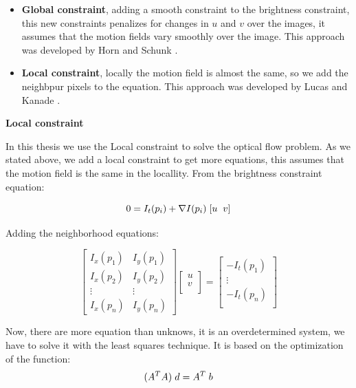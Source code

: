 \documentclass[12pt, a4paper, titlepage,twoside,openright]{article}
\begin{document}
\begin{itemize}

\item \textbf{Global constraint}, adding a smooth constraint to the brightness constraint, this new constraints penalizes for changes in $u$ and $v$ over the images, it assumes that the motion fields vary smoothly over the image. This approach was developed by Horn and Schunk \cite{horn}.

\item \textbf{Local constraint}, locally the motion field is almost the same, so we add the neighbpur pixels to the equation. This approach was developed by Lucas and Kanade \cite{LucasKana}.
\end{itemize}



\textbf{Local constraint}

In this thesis we use the Local constraint to solve the optical flow problem. As we stated above, we add a local constraint to get more equations, this assumes that the motion field is the same in the locallity. From the brightness constraint equation:

$$ 0 = I_{t}(p_{i}) + \nabla I(p_{i}) \hspace{0.1cm} [u \hspace{0.2cm} v]$$

Adding the neighborhood equations:


\[
\begin{bmatrix}
    I_{x}(p_{1}) & I_{y}(p_{1})  \\
    I_{x}(p_{2}) & I_{y}(p_{2})  \\
    \vdots & \vdots  \\
    I_{x}(p_{n}) & I_{y}(p_{n})
\end{bmatrix}
\begin{bmatrix}
    u \\
    v \\
\end{bmatrix}
=
\begin{bmatrix}
    -I_{t}(p_{1}) \\
    \vdots \\
    -I_{t}(p_{n}) \\
\end{bmatrix}
\]


Now, there are more equation than unknows, it is an overdetermined system, we have to solve it with the least squares technique. It is based on the optimization of the function:
$$(A^{T}A) \hspace{0.1cm} d=A^{T} \hspace{0.1cm} b$$
\end{document}
